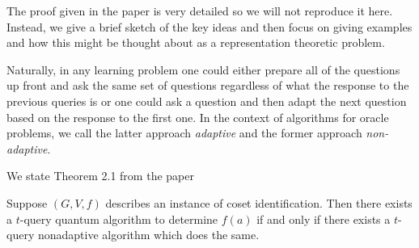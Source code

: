 The proof given in the paper is very detailed so we will not reproduce it here. Instead, we give a brief sketch of 
the key ideas and then focus on giving examples and how this might be thought about as a representation theoretic 
problem.


Naturally, in any learning problem one could either prepare all of the questions up front and ask the same set of 
questions regardless of what the response to the previous queries is or one could ask a question and then adapt the 
next question based on the response to the first one. In the context of algorithms for oracle problems, we call the 
latter approach \emph{adaptive} and the former approach \emph{non-adaptive}.



We state Theorem 2.1 from the paper
\begin{theorem}
Suppose $(G,V,f)$ describes an instance of coset identification. Then there exists a $t$-query quantum algorithm to 
determine $f(a)$ if and only if there exists a $t$-query nonadaptive algorithm which does the same.
\end{theorem}




















